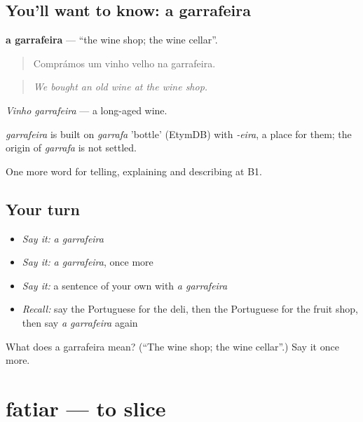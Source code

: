 \subsection*{You'll want to know: a garrafeira}
\textbf{a garrafeira} — \textquotedblleft{}the wine shop; the wine cellar\textquotedblright{}.

\begin{quote}
Comprámos um vinho velho na garrafeira.
\end{quote}

\begin{quote}
\emph{We bought an old wine at the wine shop.}
\end{quote}

\emph{Vinho garrafeira} — a long-aged wine.

\begin{cousinweb}
\emph{garrafeira} is built on \emph{garrafa} 'bottle' (EtymDB) with \emph{-eira}, a place for them; the origin of \emph{garrafa} is not settled.
\end{cousinweb}

\begin{grammarlens}[title={What you've built}]
One more word for telling, explaining and describing at B1.
\end{grammarlens}

\subsection*{Your turn}
\begin{itemize}
\raggedright
  \item \emph{Say it:} \emph{a garrafeira}
  \item \emph{Say it:} \emph{a garrafeira}, once more
  \item \emph{Say it:} a sentence of your own with \emph{a garrafeira}
  \item \emph{Recall:} say the Portuguese for the deli, then the Portuguese for the fruit shop, then say \emph{a garrafeira} again
\end{itemize}

\begin{tcolorbox}[breakable,colback=teal!4,colframe=teal!35!black,title={Before you move on}]
What does a garrafeira mean? (\textquotedblleft{}The wine shop; the wine cellar\textquotedblright{}.) Say it once more.
\end{tcolorbox}
\section[fatiar]{fatiar — to slice}

